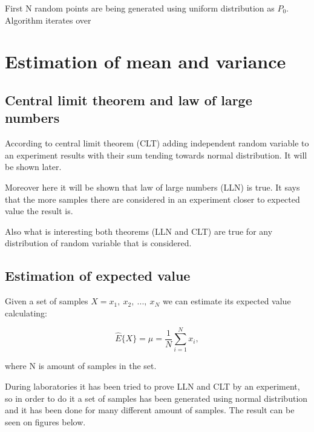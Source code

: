 \documentclass[11pt]{article}
\begin{document}
	First N random points are being generated using uniform distribution as
	$P_{0}$.
	Algorithm iterates over  
	
		
	\section{Estimation of mean and variance}		
	\subsection{Central limit theorem and law of large numbers}
	
	According to central limit theorem (CLT) adding independent random variable
	to an experiment results with their sum tending towards normal distribution.
	It will be shown later.
	
	Moreover here it will be shown that law of large numbers (LLN) is true.
	It says that the more samples there are considered in an experiment closer
	to expected value the result is.
	
	Also what is interesting both theorems (LLN and CLT) are true for any
	distribution of random variable that is considered. 	
	
	\subsection{Estimation of expected value}
	
	Given a set of samples $X={x_{1},\ x_{2},\ ...,\ x_{N}}$ we can estimate
	its expected value calculating:
	
	$$\hat{E}\{X\}=\mu=\frac{1}{N}\sum_{i=1}^{N}x_{i},$$
	
	where N is amount of samples in the set.
	
	During laboratories it has been tried to prove LLN and CLT by an experiment,
	so in order to do it a set of samples has been generated using normal
	distribution and it has been done for many different amount of samples.
	The result can be seen on figures below.
	
	
\end{document}
